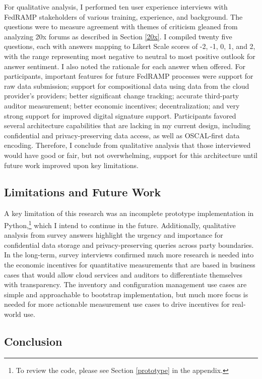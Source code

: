 \documentclass{jdf}
\begin{document}
For qualitative analysis, I performed ten user experience interviews with FedRAMP stakeholders of various training, experience, and background. The questions were to measure agreement with themes of criticism gleaned from analyzing 20x forums as described in Section \ref{20x}. I compiled twenty five questions, each with answers mapping to Likert Scale scores of -2, -1, 0, 1, and 2, with the range representing most negative to neutral to most positive outlook for answer sentiment. I also noted the rationale for each answer when offered. For participants, important features for future FedRAMP processes were support for raw data submission; support for compositional data using data from the cloud provider's providers; better significant change tracking; accurate third-party auditor measurement; better economic incentives; decentralization; and very strong support for improved digital signature support. Participants favored several architecture capabilities that are lacking in my current design, including confidential and privacy-preserving data access, as well as OSCAL-first data encoding. Therefore, I conclude from qualitative analysis that those interviewed would have good or fair, but not overwhelming, support for this architecture until future work improved upon key limitations.

\subsection{Limitations and Future Work}

A key limitation of this research was an incomplete prototype implementation in Python,\footnote{To review the code, please see Section \ref{prototype} in the appendix.} which I intend to continue in the future. Additionally, qualitative analysis from survey answers highlight the urgency and importance for confidential data storage and privacy-preserving queries across party boundaries. In the long-term, survey interviews confirmed much more research is needed into the economic incentives for quantitative measurements that are based in business cases that would allow cloud services and auditors to differentiate themselves with transparency. The inventory and configuration management use cases are simple and approachable to bootstrap implementation, but much more focus is needed for more actionable measurement use cases to drive incentives for real-world use.

\subsection{Conclusion}
\end{document}

